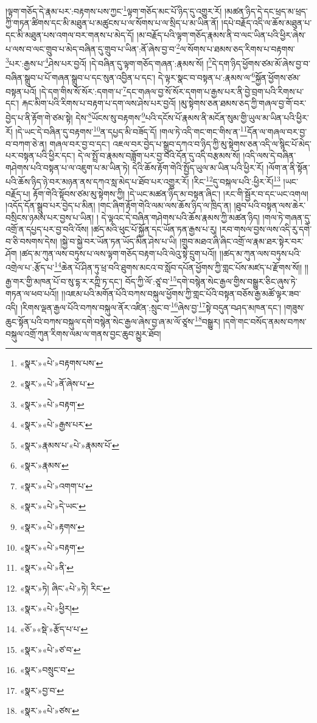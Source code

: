 །ལྟག་གཅོད་དེ་རྣམ་པར་:བརྟགས་པས་ཀྱང་\footnote{«སྣར་»«པེ་»བརྟགས་པས་}ལྟག་གཅོད་མང་པོ་ཉིད་དུ་འགྱུར་རོ། །མཚན་ཉིད་དེ་དང་ཕྲད་མ་ཕྲད་ཀྱི་གཏན་ཚིགས་དང་མི་མཐུན་པ་མཚུངས་པ་ལ་སོགས་པ་ལ་སྲིད་པ་མ་ཡིན་ནོ། །དཔེ་བརྗོད་འདི་ལ་ཆོས་མཐུན་པ་དང་མི་མཐུན་པས་འགལ་བར་གནས་པ་མེད་དོ། །མ་བརྗོད་པའི་ལྟག་གཅོད་རྣམས་ནི་བ་ལང་ཡིན་པའི་ཕྱིར་ཞེས་པ་ལས་བ་ལང་གྲུབ་པ་མེད་བཞིན་དུ་གྲུབ་པ་ཡིན་:ནོ་ཞེས་བྱ་བ་\footnote{«སྣར་»«པེ་»ནོ་ཞེས་པ་}ལ་སོགས་པ་ཐམས་ཅད་རིགས་པ་བརྟགས་\footnote{«སྣར་»«པེ་»བརྟག་}པར་:རྒྱས་པ་\footnote{«སྣར་»«པེ་»རྒྱས་པར་}ཤེས་པར་བྱའོ། །དེ་བཞིན་དུ་ལྟག་གཅོད་གཞན་:རྣམས་སོ། །\footnote{«སྣར་»རྣམས་པ་«པེ་»རྣམས་པོ་}དེ་དག་ཉིད་ཕྱོགས་ཙམ་མོ་ཞེས་བྱ་བ་བཞིན་སྒྲུབ་པ་པོ་གཞན་སྒྲུབ་པ་དང་སུན་འབྱིན་པ་དང་། དེ་ལྟར་སྣང་བ་བསྟན་པ་:རྣམས་ལ་\footnote{«སྣར་»རྣམས་}སྐྱོན་ཕྱོགས་ཙམ་བསྟན་པའོ། །དེ་དག་གིས་སོ་སོར་:དགག་པ་\footnote{«སྣར་»«པེ་»འགག་པ་}དང་གཞལ་བྱ་སོ་སོར་དགག་པ་རྒྱས་པར་ནི་བྱེ་བྲག་པའི་རིགས་པ་དང་། རྐང་མིག་པའི་རིགས་པ་བརྟག་པ་དག་ལས་ཤེས་པར་བྱའོ། །མུ་སྟེགས་ཅན་ཐམས་ཅད་ཀྱི་གཞལ་བྱ་གོ་བར་བྱེད་པ་ནི་རྟོག་གེ་ཙམ་སྟེ། དེས་\footnote{«སྣར་»«པེ་»དེ་ཡང་}ཡོངས་སུ་བརྟགས་\footnote{«སྣར་»«པེ་»རྟགས་}པའི་དངོས་པོ་རྣམས་ནི་མངོན་སུམ་གྱི་ཡུལ་མ་ཡིན་པའི་ཕྱིར་རོ། །དེ་ཡང་དེ་བཞིན་དུ་བརྟགས་\footnote{«སྣར་»«པེ་»བརྟག་}ན་དཔྱད་མི་བཟོད་དོ། །གལ་ཏེ་འདི་གང་གང་གིས་ན་\footnote{«སྣར་»«པེ་»ནི་}དོན་ལ་གཞལ་བར་བྱ་བ་བཀག་ཅེ་ན། གཞལ་བར་བྱ་བ་དང་། འཇལ་བར་བྱེད་པ་སྒྲུབ་དཀའ་བ་ཉིད་ཀྱི་མུ་སྟེགས་ཅན་འདི་ལ་སྙིང་པོ་མེད་པར་བསྟན་པའི་ཕྱིར་དང་། དེ་ལ་སྤྲོ་བ་རྣམས་བཟློག་པར་བྱ་བའི་དོན་དུ་འདི་བརྩམས་སོ། །འདི་ལས་དེ་བཞིན་གཤེགས་པའི་བསྟན་པ་ལ་འཇུག་པ་མ་ཡིན་ཏེ། དེའི་ཆོས་རྟོག་གེའི་སྤྱོད་ཡུལ་མ་ཡིན་པའི་ཕྱིར་རོ། །ལོག་ན་ནི་སྟོན་པའི་ཆོས་ཉིད་ཉེ་བར་མཉན་ནས་དཀའ་སླ་མེད་པ་ཐོབ་པར་འགྱུར་རོ། །རིང་\footnote{«སྣར་»ཏེ། ཞིང་«པེ་»ཏེ། རིང་}དུ་བསྐལ་པའི་:ཕྱིར་རོ།\footnote{«སྣར་»«པེ་»ཕྱིར།} །ཡང་བརྗོད་པ། རྟོག་གེའི་སྟོབས་ཙམ་མུ་སྟེགས་ཀྱི། །དེ་ཡང་མཚན་ཉིད་མ་བསྟན་ཞིང་། །རང་གི་སྦྱོར་བ་དང་ཡང་འགལ། །འདོད་དོན་སྒྲུབ་པར་བྱེད་པ་མིན། །གང་ཞིག་རྟོག་གེའི་ལམ་ལས་ཆོས་ཉིད་ལ་ཁྲིད་ན། །ཐུབ་པའི་བསྟན་ལས་ཆེར་བསྲིངས་ཉམས་པར་བྱས་པ་ཡིན། །
དེ་ལྟའང་དེ་བཞིན་གཤེགས་པའི་ཆོས་རྣམས་ཀྱི་མཚན་ཉིད། །གལ་ཏེ་གཞན་དུ་འགྲོ་ན་དཔྱད་པར་བྱ་བའི་འོས། །ཚད་མའི་ཕུང་པོ་སྐྱོན་དང་ཡོན་ཏན་རྒྱས་པ་རུ། །རབ་གསལ་བྱས་ལས་འདི་རུ་དགེ་བ་ཅི་བསགས་དེས། །སྐྱེ་བ་སྐྱེ་བར་ཡོན་ཏན་ཡོད་མིན་ཤེས་པ་ཡི། །གྲུབ་མཐའ་ཞི་ཞིང་འགྲོ་ལ་རྣམ་ཐར་སྟེར་བར་ཤོག །ཚད་མ་ཀུན་ལས་བཏུས་པ་ལས་ལྟག་གཅོད་བརྟག་པའི་ལེའུ་སྟེ་དྲུག་པའོ།། །།ཚད་མ་ཀུན་ལས་བཏུས་པའི་འགྲེལ་པ་:རྩོད་པ་\footnote{«ཅོ་»«སྡེ་»རྩོད་པ་པ་}ཆེན་པོ་ཤིན་ཏུ་ཕྲ་བའི་ཐུགས་མངའ་བ་སློབ་དཔོན་ཕྱོགས་ཀྱི་གླང་པོས་མཛད་པ་རྫོགས་སོ།། །།རྒྱ་གར་གྱི་མཁན་པོ་བ་སུ་དྷ་ར་རཀྵི་ཏ་དང་། བོད་ཀྱི་ལོ་:ཙཱ་བ་\footnote{«སྣར་»«པེ་»ཙ་བ་}དགེ་བསྙེན་སེང་རྒྱལ་གྱིས་བསྒྱུར་ཅིང་ཞུས་ཏེ་གཏན་ལ་ཕབ་པའོ།། །།འཇམ་པའི་མགོན་པོའི་བཀས་བསྐུལ་ཕྱོགས་ཀྱི་གླང་པོའི་བསྟན་བཅོས་རྒྱ་མཚོ་ལྟར་ཟབ་འདི། །རིགས་ལྡན་རྒྱལ་པོའི་བཀས་བསྐུལ་ནོར་འཛིན་:སྲུང་བ་\footnote{«སྣར་»བསྲུང་བ་}ཞེས་བྱ་\footnote{«སྣར་»བྱ་བ་}སྟེ་བདུན་བཤད་མཁན་དང་། །གཟུས་ཆུང་སྟོན་པའི་བཀས་བསྐུལ་དགེ་བསྙེན་སེང་རྒྱལ་ཞེས་བྱ་ཞ་མ་ལོ་ཙཱས་\footnote{«སྣར་»«པེ་»ཙས་}བསྒྱུར། །དགེ་གང་བསོད་ནམས་བཀས་བསྐུལ་འགྲོ་ཀུན་རིགས་ལམ་ལ་གནས་བྱང་ཆུབ་མྱུར་ཐོབ།